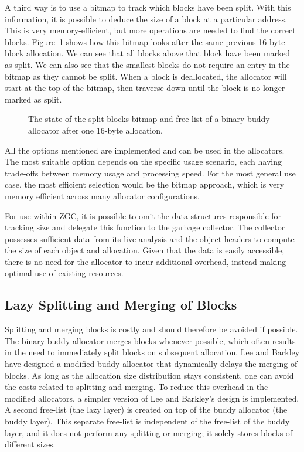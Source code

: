 A third way is to use a bitmap to track which blocks have been split. With this information, it is possible to deduce the size of a block at a particular address. This is very memory-efficient, but more operations are needed to find the correct blocks. Figure~\ref{fig:buddybmapsplit} shows how this bitmap looks after the same previous 16-byte block allocation. We can see that all blocks above that block have been marked as split. We can also see that the smallest blocks do not require an entry in the bitmap as they cannot be split. When a block is deallocated, the allocator will start at the top of the bitmap, then traverse down until the block is no longer marked as split.

\begin{figure}[h]
    \centering
    
    \caption{The state of the split blocks-bitmap and free-list of a binary buddy allocator after one 16-byte allocation.}
    \label{fig:buddybmapsplit}
\end{figure}

All the options mentioned are implemented and can be used in the allocators.  The most suitable option depends on the specific usage scenario, each having trade-offs between memory usage and processing speed. For the most general use case, the most efficient selection would be the bitmap approach, which is very memory efficient across many allocator configurations.

For use within ZGC, it is possible to omit the data structures responsible for tracking size and delegate this function to the garbage collector. The collector possesses sufficient data from its live analysis and the object headers to compute the size of each object and allocation. Given that the data is easily accessible, there is no need for the allocator to incur additional overhead, instead making optimal use of existing resources.

\subsection{Lazy Splitting and Merging of Blocks} \label{sec:lazyexpl}
Splitting and merging blocks is costly and should therefore be avoided if possible. The binary buddy allocator merges blocks whenever possible, which often results in the need to immediately split blocks on subsequent allocation. Lee and Barkley \cite{lazylayer} have designed a modified buddy allocator that dynamically delays the merging of blocks. As long as the allocation size distribution stays consistent, one can avoid the costs related to splitting and merging. To reduce this overhead in the modified allocators, a simpler version of Lee and Barkley's design is implemented. A second free-list (the lazy layer) is created on top of the buddy allocator (the buddy layer). This separate free-list is independent of the free-list of the buddy layer, and it does not perform any splitting or merging; it solely stores blocks of different sizes.

